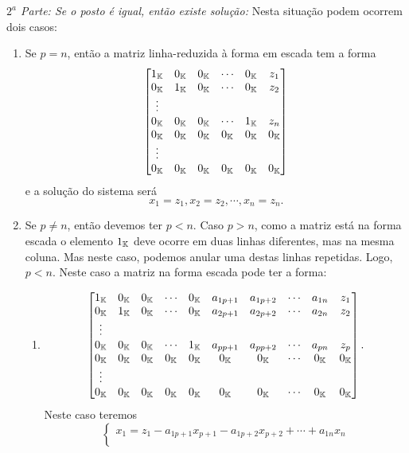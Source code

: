 \begin{prova}
	\textit{$2^a$ Parte: Se o posto \'e igual, ent\~ao existe solu\c{c}\~ao:} Nesta situa\c{c}\~ao podem ocorrem dois casos:
	\begin{enumerate}
		\item Se $p = n$, ent\~ao a matriz linha-reduzida \`a forma em escada tem a forma
		\[
			\begin{bmatrix}
				1_{\mathbb{K}} & 0_{\mathbb{K}} & 0_{\mathbb{K}} & \cdots & 0_{\mathbb{K}} & z_1\\
				0_{\mathbb{K}} & 1_{\mathbb{K}} & 0_{\mathbb{K}} & \cdots & 0_{\mathbb{K}} & z_2\\
				\vdots\\
				0_{\mathbb{K}} & 0_{\mathbb{K}} & 0_{\mathbb{K}} & \cdots & 1_{\mathbb{K}} & z_n\\
				0_{\mathbb{K}} & 0_{\mathbb{K}} & 0_{\mathbb{K}} & 0_{\mathbb{K}} & 0_{\mathbb{K}} & 0_{\mathbb{K}}\\
				\vdots\\
				0_{\mathbb{K}} & 0_{\mathbb{K}} & 0_{\mathbb{K}} & 0_{\mathbb{K}} & 0_{\mathbb{K}} & 0_{\mathbb{K}}
			\end{bmatrix}
		\]
		e a solu\c{c}\~ao do sistema ser\'a
		\[
			x_1 = z_1, x_2 = z_2, \cdots, x_n = z_n.
		\]
		\item Se $p \ne n$, ent\~ao devemos ter $p < n$. Caso $p > n$, como a matriz est\'a na forma escada o elemento $1_{\mathbb{K}}$ deve ocorre em duas linhas diferentes, mas na mesma coluna. Mas neste caso, podemos anular uma destas linhas repetidas. Logo, $p < n$. Neste caso a matriz na forma escada pode ter a forma:
		\begin{enumerate}
			\item \[
			\begin{bmatrix}
				1_{\mathbb{K}} & 0_{\mathbb{K}} & 0_{\mathbb{K}} & \cdots & 0_{\mathbb{K}} & a_{1p+1} & a_{1p+2} & \cdots & a_{1n} & z_1\\
				0_{\mathbb{K}} & 1_{\mathbb{K}} & 0_{\mathbb{K}} & \cdots & 0_{\mathbb{K}} & a_{2p+1} & a_{2p+2} & \cdots & a_{2n} & z_2\\
				\vdots\\
				0_{\mathbb{K}} & 0_{\mathbb{K}} & 0_{\mathbb{K}} & \cdots & 1_{\mathbb{K}} & a_{pp+1} & a_{pp+2} & \cdots & a_{pn} & z_p\\
				0_{\mathbb{K}} & 0_{\mathbb{K}} & 0_{\mathbb{K}} & 0_{\mathbb{K}} & 0_{\mathbb{K}} & 0_{\mathbb{K}} & 0_{\mathbb{K}} & \cdots & 0_{\mathbb{K}} & 0_{\mathbb{K}}\\
				\vdots\\
				0_{\mathbb{K}} & 0_{\mathbb{K}} & 0_{\mathbb{K}} & 0_{\mathbb{K}} & 0_{\mathbb{K}} & 0_{\mathbb{K}} & 0_{\mathbb{K}} & \cdots & 0_{\mathbb{K}}  & 0_{\mathbb{K}}
			\end{bmatrix}.
		\]
		Neste caso teremos
		\[
			\begin{cases}
				x_1 = z_1 - a_{1 p + 1}x_{p + 1} - a_{1 p + 2}x_{p + 2} + \cdots + a_{1n}x_{n}\\

\end{cases}\]
\end{enumerate}
\end{enumerate}
\end{prova}
